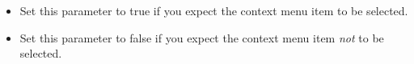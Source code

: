 
\begin{itemize}
\item Set this parameter to true if you expect the context menu item to be selected. 
\item  Set this parameter to false if you expect the context menu item \emph{not} to be selected.
\end{itemize}
